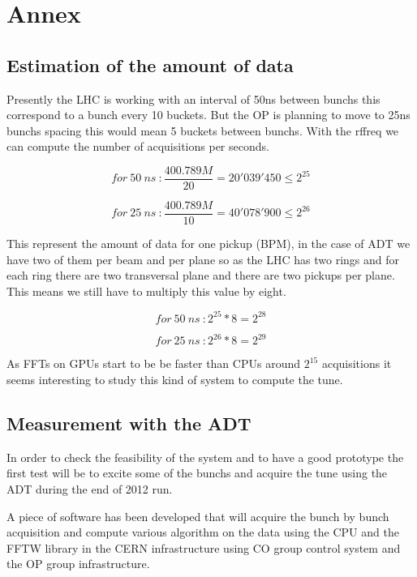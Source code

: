 %

\chapter{Annex}

\section{Estimation of the amount of data}

Presently the \gls{LHC} is working with an interval of 50ns between \glspl{bunch} this correspond to a bunch every 10 \glspl{bucket}. But the \gls{OP} is planning to move to 25ns \glspl{bunch} spacing this would mean 5 \glspl{bucket} between \glspl{bunch}. With the \gls{rffreq} we can compute the number of acquisitions per seconds.

$$for~50~ns~: \frac{400.789M}{20} = 20'039'450 \leq 2^{25}$$

$$for~25~ns~: \frac{400.789M}{10} = 40'078'900 \leq 2^{26}$$ 

This represent the amount of data for one pickup (\gls{BPM}), in the case of \gls{ADT} we have two of them per beam and per plane so as the \gls{LHC} has two rings and for each ring there are two transversal plane and there are two pickups per plane. This means we still have to multiply this value by eight.

$$for~50~ns~: 2^{25} * 8 = 2^{28}$$

$$for~25~ns~: 2^{26} * 8 = 2^{29}$$

As \glspl{FFT} on \glspl{GPU} start to be be faster than \glspl{CPU} around $2^{15}$ acquisitions it seems interesting to study this kind of system to compute the \gls{tune}.

\section{Measurement with the ADT}

In order to check the feasibility of the system and to have a good prototype the first test will be to excite some of the \glspl{bunch} and acquire the \gls{tune} using the \gls{ADT} during the end of 2012 run\cite{Valuch12}.

A piece of software has been developed that will acquire the bunch by bunch acquisition and compute various algorithm on the data using the \gls{CPU} and the \gls{FFTW} library in the \gls{CERN} infrastructure using \gls{CO} group control system and the \gls{OP} group infrastructure.

